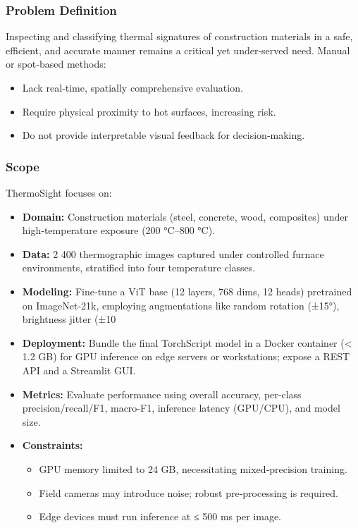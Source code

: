 \subsubsection*{Problem Definition}
Inspecting and classifying thermal signatures of construction materials in a safe, efficient, and accurate manner remains a critical yet under‐served need. Manual or spot‐based methods:

\begin{itemize}
    \item Lack real‐time, spatially comprehensive evaluation.
    \item Require physical proximity to hot surfaces, increasing risk.
    \item Do not provide interpretable visual feedback for decision‐making.
\end{itemize}

\subsubsection*{Scope}
ThermoSight focuses on:

\begin{itemize}
    \item \textbf{Domain:} Construction materials (steel, concrete, wood, composites) under high‐temperature exposure (200 °C–800 °C).
    \item \textbf{Data:} 2 400 thermographic images captured under controlled furnace environments, stratified into four temperature classes.
    \item \textbf{Modeling:} Fine‐tune a ViT base (12 layers, 768 dims, 12 heads) pretrained on ImageNet‐21k, employing augmentations like random rotation (±15°), brightness jitter (±10 %
    \item \textbf{Deployment:} Bundle the final TorchScript model in a Docker container (< 1.2 GB) for GPU inference on edge servers or workstations; expose a REST API and a Streamlit GUI.
    \item \textbf{Metrics:} Evaluate performance using overall accuracy, per‐class precision/recall/F1, macro‐F1, inference latency (GPU/CPU), and model size.
    \item \textbf{Constraints:} 
    \begin{itemize}
        \item GPU memory limited to 24 GB, necessitating mixed‐precision training.  
        \item Field cameras may introduce noise; robust pre‐processing is required.  
        \item Edge devices must run inference at ≤ 500 ms per image.  
    \end{itemize}
\end{itemize}

